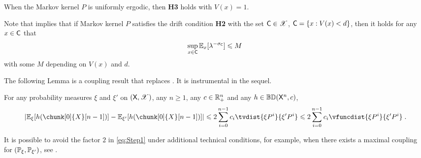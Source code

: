 \documentclass[leqno,11pt,a4paper]{article}
\begin{document}
\par
When the Markov kernel $P$ is uniformly ergodic, then {\bf H3} holds with $V(x) = 1$.   
\par
Note that \cite[Proposition 14.3.1]{douc:moulines:priouret:soulier:2018} implies that if Markov kernel $P$ satisfies the drift condition {\bf H2} with the set $\mathsf{C} \in \mathscr{X}$, $\mathsf{C} = \{x: V(x) < d\}$, then it holds for any $x \in \mathsf{C}$ that
\[
\sup_{x\in \mathsf{C}}\mathbb{E}_x[\lambda^{-\sigma_{\mathsf{C}}}]\leqslant M\;
\]
with some $M$ depending on $V(x)$ and $d$.
\par
The following Lemma is a coupling result that replaces \cite[Lemma~6]{MR3407208}. It is instrumental in the sequel.
\begin{lemma}\label{lem:DMPS18}
 For any probability measures $\xi$ and $\xi'$ on $(\mathsf{X},\mathscr{X})$, any $n\geqslant 1$, any $c\in \mathbb{R}_+^n$ and any $h\in \mathbb{B}\mathbb{D}(\mathsf{X}^n,c)$,
\begin{equation*}\label{eq:Step1}
 |\Ebb_\xi[h(\chunk[0]{X}[n-1])]-\Ebb_{\xi'}[h(\chunk[0]{X}[n-1])]|\leqslant 2\sum_{i=0}^{n-1}c_i \tvdist{\xi P^i}{\xi'P^i} \leqslant 2\sum_{i=0}^{n-1}c_i \vfuncdist{\xi P^i}{\xi'P^i} \eqsp.
\end{equation*}
\end{lemma}
\begin{remark}
 It is possible to avoid the factor $2$ in \eqref{eq:Step1} under additional technical conditions, for example, when there exists a maximal coupling for $(\mathbb{P}_\xi,\mathbb{P}_{\xi'})$, see \cite[Lemma 23.2.1]{douc:moulines:priouret:soulier:2018}.
\end{remark}
\end{document}
